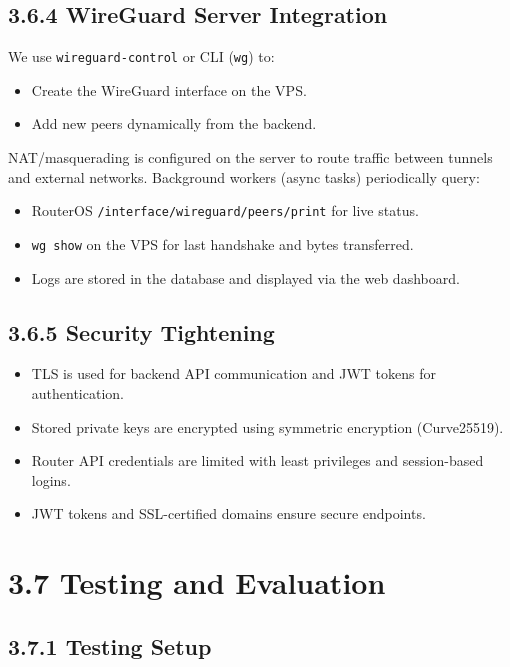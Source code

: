 \documentclass[12pt,a4paper,oneside]{report}
\begin{document}
\subsection{3.6.4 WireGuard Server Integration}

We use \texttt{wireguard-control} or CLI (\texttt{wg}) to:

\begin{itemize}
  \item Create the WireGuard interface on the VPS.
  \item Add new peers dynamically from the backend.
\end{itemize}

NAT/masquerading is configured on the server to route traffic between tunnels and external networks. Background workers (async tasks) periodically query:

\begin{itemize}
  \item RouterOS \texttt{/interface/wireguard/peers/print} for live status.
  \item \texttt{wg show} on the VPS for last handshake and bytes transferred.
  \item Logs are stored in the database and displayed via the web dashboard.
\end{itemize}

\subsection{3.6.5 Security Tightening}

\begin{itemize}
  \item TLS is used for backend API communication and JWT tokens for authentication.
  \item Stored private keys are encrypted using symmetric encryption (Curve25519).
  \item Router API credentials are limited with least privileges and session-based logins.
  \item JWT tokens and SSL-certified domains ensure secure endpoints.
\end{itemize}

\section{3.7 Testing and Evaluation}

\subsection{3.7.1 Testing Setup}
\end{document}
